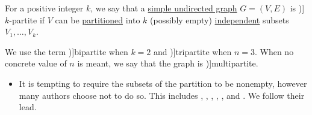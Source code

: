 \begin{definition}\label{def:multipartite_graph}
  For a positive integer \( k \), we say that a \hyperref[def:undirected_graph]{simple undirected graph} \( G = (V, E) \) is \term[ru=\( k \)-дольный (граф) (\cite[11]{Емеличев1990})]{\( k \)-partite} if \( V \) can be \hyperref[def:set_partition]{partitioned} into \( k \) (possibly empty) \hyperref[def:graph_independent_set]{independent} subsets \( V_1, \ldots, V_k \).

  We use the term \term[ru=двудольный (граф) (\cite[11]{Емеличев1990})]{bipartite} when \( k = 2 \) and \term[ru=трёхдольный (граф) (\cite[11]{Емеличев1990})]{tripartite} when \( n = 3 \). When no concrete value of \( n \) is meant, we say that the graph is \term[en=multipartite (graph) (\cite[ex. 8.5.5]{Knauer2011})]{multipartite}.
\end{definition}
\begin{itemize}
  \item It is tempting to require the subsets of the partition to be nonempty, however many authors choose not to do so. This includes , , , , ,  and . We follow their lead.
\end{itemize}

